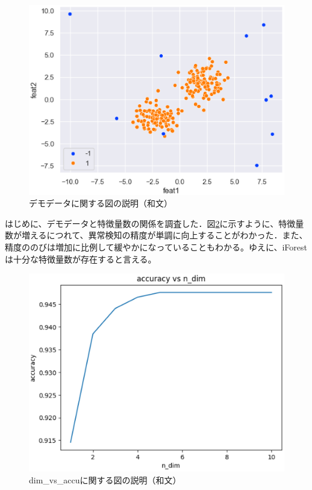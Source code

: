 \documentclass{css}
\begin{document}
\begin{figure}[tb]
    \centering
    \includegraphics[width=\linewidth]{pictures/eps/demodata.eps}
    \caption{デモデータに関する図の説明（和文）}
    \label{fig:demodata}
\end{figure}

はじめに、デモデータと特徴量数の関係を調査した．図\ref{fig:dim_vs_accu}に示すように、特徴量数が増えるにつれて、異常検知の精度が単調に向上することがわかった．また、精度ののびは増加に比例して緩やかになっていることもわかる。ゆえに、iForestは十分な特徴量数が存在すると言える。

\begin{figure}[tb]
    \centering
    \includegraphics[width=\linewidth]{pictures/eps/dim_vs_accu.eps}
    \caption{dim\_vs\_accuに関する図の説明（和文）}
    \label{fig:dim_vs_accu}
\end{figure}
\end{document}
